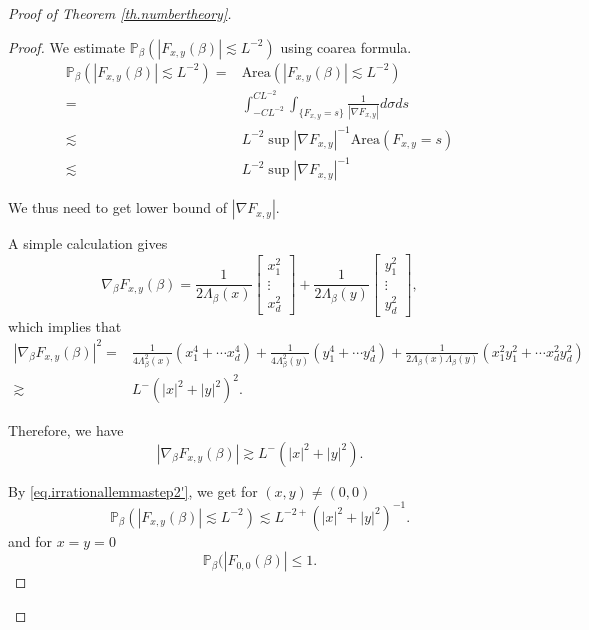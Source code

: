 \begin{proof}[Proof of Theorem \ref{th.numbertheory}]
\begin{proof}
We estimate $\mathbb{P}_{\beta}(|F_{x,y}(\beta)|\lesssim L^{-2})$ using coarea formula. 
\begin{equation}\label{eq.irrationallemmastep2'}
\begin{split}
    \mathbb{P}_{\beta}(|F_{x,y}(\beta)|\lesssim L^{-2})=&\text{Area}(|F_{x,y}(\beta)|\lesssim L^{-2})
    \\
    =& \int^{CL^{-2}}_{-CL^{-2}} \int_{\{F_{x,y}=s\}}\frac{1}{|\nabla F_{x,y}|}d\sigma ds
    \\
    \lesssim& L^{-2} \sup |\nabla F_{x,y}|^{-1} \text{Area}(F_{x,y}=s)
    \\
    \lesssim& L^{-2} \sup |\nabla F_{x,y}|^{-1}
\end{split}
\end{equation}

We thus need to get lower bound of $|\nabla F_{x,y}|$.

A simple calculation gives
\begin{equation}
    \nabla_{\beta} F_{x,y}(\beta)=\frac{1}{2\Lambda_{\beta}(x)}\begin{bmatrix} x_1^2\\\vdots\\x_d^2
    \end{bmatrix}+\frac{1}{2\Lambda_{\beta}(y)}\begin{bmatrix} y_1^2\\\vdots\\y_d^2
    \end{bmatrix},
\end{equation}
which implies that 
\begin{equation}
\begin{split}
    |\nabla_{\beta} F_{x,y}(\beta)|^2=&\frac{1}{4\Lambda^2_{\beta}(x)} (x_1^4+\cdots x_d^4) +\frac{1}{4\Lambda^2_{\beta}(y)} (y_1^4+\cdots y_d^4)+\frac{1}{2\Lambda_{\beta}(x)\Lambda_{\beta}(y)} (x_1^2y_1^2+\cdots x_d^2y_d^2)
    \\
    \gtrsim& L^{-} (|x|^2+|y|^2)^2.
\end{split}
\end{equation}

Therefore, we have 
\begin{equation}
    |\nabla_{\beta} F_{x,y}(\beta)|\gtrsim L^{-} (|x|^2+|y|^2).
\end{equation}

By \eqref{eq.irrationallemmastep2'}, we get for $(x,y)\ne (0,0)$
\begin{equation}
    \mathbb{P}_{\beta}(|F_{x,y}(\beta)|\lesssim L^{-2})\lesssim L^{-2+} (|x|^2+|y|^2)^{-1}.
\end{equation}
and for $x=y=0$
\begin{equation}
    \mathbb{P}_{\beta}(|F_{0,0}(\beta)|\le 1.
\end{equation}


\end{proof}
\end{proof}
